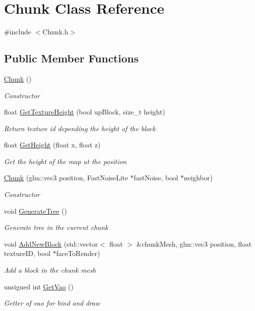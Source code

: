 \hypertarget{class_chunk}{}\section{Chunk Class Reference}
\label{class_chunk}


{\ttfamily \#include $<$Chunk.\+h$>$}

\subsection*{Public Member Functions}
\begin{DoxyCompactItemize}
\item 
\mbox{\hyperlink{class_chunk_acc32e1562cad6664c98ee07edecdbdf9}{Chunk}} ()
\begin{DoxyCompactList}\small\item\em Constructor \end{DoxyCompactList}\item 
float \mbox{\hyperlink{class_chunk_a50d430bf28b34c7ec90ecec2b57c9e6c}{Get\+Texture\+Height}} (bool up\+Block, size\+\_\+t height)
\begin{DoxyCompactList}\small\item\em Return texture id depending the height of the block \end{DoxyCompactList}\item 
float \mbox{\hyperlink{class_chunk_a1c40c186542052bcdcf8038dd00030e0}{Get\+Height}} (float x, float z)
\begin{DoxyCompactList}\small\item\em Get the height of the map at the position \end{DoxyCompactList}\item 
\mbox{\hyperlink{class_chunk_a39e0ddfaeaee152e9e591499590181b0}{Chunk}} (glm\+::vec3 position, Fast\+Noise\+Lite $\ast$fast\+Noise, bool $\ast$neighbor)
\begin{DoxyCompactList}\small\item\em Constructor \end{DoxyCompactList}\item 
void \mbox{\hyperlink{class_chunk_ae89462a5142b243782cc614a760aac0e}{Generate\+Tree}} ()
\begin{DoxyCompactList}\small\item\em Generate tree in the current chunk \end{DoxyCompactList}\item 
void \mbox{\hyperlink{class_chunk_adc1dda02949c5a00814855aba2b592b4}{Add\+New\+Block}} (std\+::vector$<$ float $>$ \&chunk\+Mesh, glm\+::vec3 position, float texture\+ID, bool $\ast$face\+To\+Render)
\begin{DoxyCompactList}\small\item\em Add a block in the chunk mesh \end{DoxyCompactList}\item 
unsigned int \mbox{\hyperlink{class_chunk_abb8569de26bbdf9f72aa692821cce21b}{Get\+Vao}} ()
\begin{DoxyCompactList}\small\item\em Getter of vao for bind and draw \end{DoxyCompactList}\end{DoxyCompactItemize}
